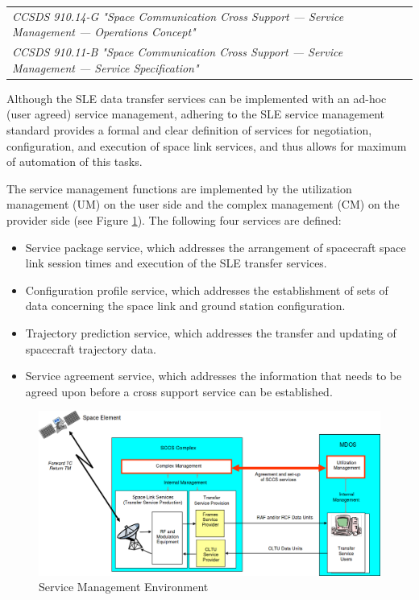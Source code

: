 \begin{tabular}{l}
\textit{CCSDS 910.14-G "Space Communication Cross Support — Service Management — Operations Concept" \cite{CCSDS-910.14-G}} \\
\textit{CCSDS 910.11-B "Space Communication Cross Support — Service Management — Service Specification" \cite{CCSDS-910.11-B}} \\
\end{tabular}

Although the SLE data transfer services can be implemented with an ad-hoc (user agreed) service management, adhering to the SLE service management standard provides a formal and clear definition of services for negotiation, configuration, and execution of space link services, and thus allows for maximum of automation of this tasks. 

The service management functions are implemented by the utilization management (UM) on the user side and the complex management (CM) on the provider side (see Figure \ref{fig:Service Management Environment}). The following four services are defined:

\begin{itemize}
\item Service package service, which addresses the arrangement of spacecraft space link session times and execution of the SLE transfer services.
\item Configuration profile service, which addresses the establishment of sets of data concerning the space link and ground station configuration.
\item Trajectory prediction service, which addresses the transfer and updating of spacecraft trajectory data.
\item Service agreement service, which addresses the information that needs to be agreed upon before a cross support service can be established.
\end{itemize}

\begin{figure}[h]
\centering\includegraphics[scale=0.3]{fig/service_management_environment}
\caption{Service Management Environment}
\label{fig:Service Management Environment}
\end{figure}

